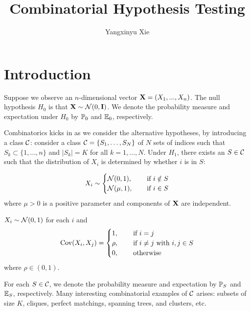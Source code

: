 \documentclass[10pt, oneside]{article}
\begin{document}
\thispagestyle{empty}
\title{Combinatorial Hypothesis Testing}
\author{Yangxinyu Xie}



\maketitle
\addtocounter{footnote}{-1}\let\thefootnote\svthefootnote

\section{Introduction}

Suppose we observe an $n$-dimensional vector $\mathbf{X} = (X_1,...,X_n)$. The null hypothesis $H_0$ is that $\mathbf{X} \sim {\mathcal N}(0, \mathbf{I})$. We denote the probability measure and expectation under $H_0$ by $\mathbb{P}_0$ and $\mathbb{E}_0$, respectively.

Combinatorics kicks in as we consider the alternative hypotheses, by introducing a class ${\mathcal C}$: consider a class ${\mathcal C}=\{S_1,\ldots,S_N\}$ of $N$ sets of indices such that $S_k \subset\{1,\ldots,n\}$ and $|S_k| = K$ for all $k=1,\ldots,N$. Under $H_1$, there
exists an $S \in {\mathcal C}$ such that the distribution of $X_i$ is determined by whether $i$ is in $S$:
\begin{alt}
  \label{alt:mean}
$$
X_i \sim
\begin{cases}
  {\mathcal N}(0,1), \quad & \mbox{ if }i \notin S\\
  {\mathcal N}(\mu,1), & \mbox{ if }i \in S
\end{cases}
$$
where $\mu>0$ is a positive parameter and components of $\mathbf{X}$ are independent. 
\end{alt}
\begin{alt}
  \label{alt:correlation}
  $X_i \sim {\mathcal N}(0,1)$ for each $i$ and 
  $$
  \operatorname{Cov}(X_i, X_j) =
  \begin{cases}
    1, \quad & \mbox{ if }i = j\\
    \rho, & \mbox{ if }i \neq j\mbox{ with }i, j \in S\\
    0, & \mbox{ otherwise}\\
  \end{cases}
  $$
  where $\rho \in (0,1).$
\end{alt}

For each $S \in {\mathcal C}$, we denote the probability measure and expectation by $\mathbb{P}_S$ and $\mathbb{E}_S$, respectively. Many interesting combinatorial examples of ${\mathcal C}$ arises: subsets of size $K$, cliques, perfect matchings, spanning trees, and clusters, etc.
\end{document}
